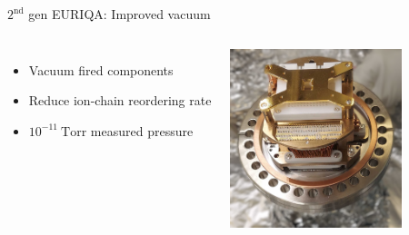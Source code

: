 \documentclass{beamer}
\begin{document}
%


\begin{frame}{$2^{\text{nd}}$ gen EURIQA: Improved vacuum}
  \begin{center}
    \begin{columns}
      \column{6.3cm}
      \begin{itemize}
      \item Vacuum fired components
      \item<2-> Reduce ion-chain reordering rate
      \item<3-> $10^{-11}\ \mathrm{Torr}$ measured pressure
      \end{itemize}
      \column{5.1cm}
      \includegraphics[width=5cm]{imgs/Vacuum_stack_photo.png}
    \end{columns}
  \end{center}
\end{frame}
\end{document}
